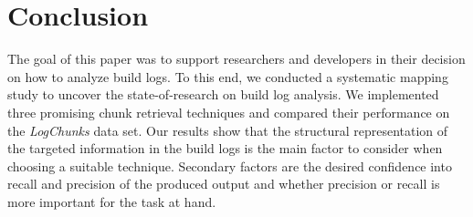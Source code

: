 \section{Conclusion}
\label{sec:conclusion-fw}
The goal of this paper was to support researchers and developers in
their decision on how to analyze build logs.
To this end, we conducted a systematic mapping study to uncover the
state-of-research on build log analysis.
We implemented	three promising chunk retrieval techniques and
compared their performance on the \emph{LogChunks} data set.
Our results show that the structural
representation of the targeted information in the build logs is the
main factor to consider when choosing a suitable technique.
Secondary
factors are the desired confidence into recall and precision of the
produced output and whether precision or recall is more important for
the task at hand.

